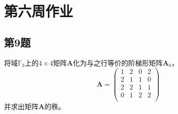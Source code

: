 \newpage
\chapter{第六周作业}
\section{第9题}
将域$\mathbb{F}_3$上的$4\times 4$矩阵$\bm{A}$化为与之行等价的阶梯形矩阵$\bm{A}_0$，
\begin{equation}
    \bm{A} = \left(
        \begin{smallmatrix}
            1 &2 &0 &2\\
            2 &1 &1 &0\\
            2 &2 &1 &1\\
            0 &1 &2 &2\\
        \end{smallmatrix}
    \right)
\end{equation}
并求出矩阵$\bm{A}$的秩。

